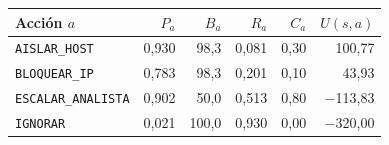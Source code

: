 \begin{tabular}{lrrrrr}
\toprule
Acción $a$ & $P_a$ & $B_a$ & $R_a$ & $C_a$ & $U(s,a)$ \\
\midrule
\texttt{AISLAR\_HOST} & 0,930 & 98,3 & 0,081 & 0,30 & 100,77 \\
\texttt{BLOQUEAR\_IP} & 0,783 & 98,3 & 0,201 & 0,10 & 43,93 \\
\texttt{ESCALAR\_ANALISTA} & 0,902 & 50,0 & 0,513 & 0,80 & $-$113,83 \\
\texttt{IGNORAR} & 0,021 & 100,0 & 0,930 & 0,00 & $-$320,00 \\
\bottomrule
\end{tabular}
